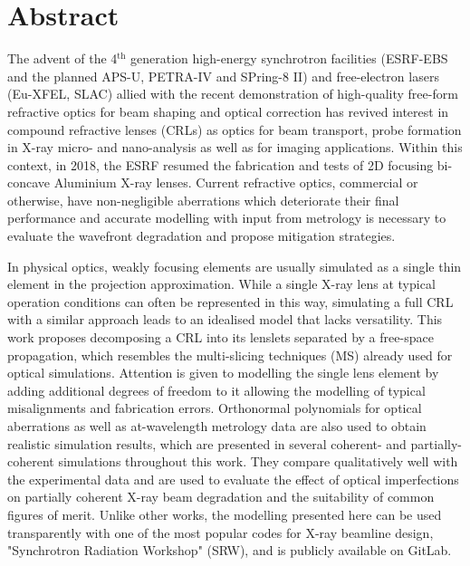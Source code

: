 \chapter*{Abstract}
\label{sec:abstractEN}
\vspace*{-10mm}

The advent of the 4$^{\text{th}}$ generation high-energy synchrotron facilities (ESRF-EBS and the planned APS-U, PETRA-IV and SPring-8 II) and free-electron lasers (Eu-XFEL, SLAC) allied with the recent demonstration of high-quality free-form refractive optics for beam shaping and optical correction has revived interest in compound refractive lenses (CRLs) as optics for beam transport, probe formation in X-ray micro- and nano-analysis as well as for imaging applications. Within this context, in 2018, the ESRF resumed the fabrication and tests of 2D focusing bi-concave Aluminium X-ray lenses. Current refractive optics, commercial or otherwise, have non-negligible aberrations which deteriorate their final performance and accurate modelling with input from metrology is necessary to evaluate the wavefront degradation and propose mitigation strategies.

In physical optics, weakly focusing elements are usually simulated as a single thin element in the projection approximation. While a single X-ray lens at typical operation conditions can often be represented in this way, simulating a full CRL with a similar approach leads to an idealised model that lacks versatility. This work proposes decomposing a CRL into its lenslets separated by a free-space propagation, which resembles the multi-slicing techniques (MS) already used for optical simulations. Attention is given to modelling the single lens element by adding additional degrees of freedom to it allowing the modelling of typical misalignments and fabrication errors. Orthonormal polynomials for optical aberrations as well as at-wavelength metrology data are also used to obtain realistic simulation results, which are presented in several coherent- and partially-coherent simulations throughout this work. They compare qualitatively well with the experimental data and are used to evaluate the effect of optical imperfections on partially coherent X-ray beam degradation and the suitability of common figures of merit. Unlike other works, the modelling presented here can be used transparently with one of the most popular codes for X-ray beamline design, "Synchrotron Radiation Workshop" (SRW), and is publicly available on GitLab.

